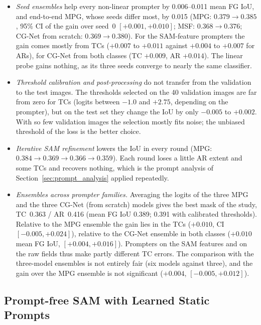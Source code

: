 \begin{itemize}
  \item \emph{Seed ensembles} help every non-linear prompter by 0.006--0.011 mean FG IoU, and end-to-end MPG, whose
  seeds differ most, by 0.015 (MPG: $0.379\rightarrow0.385$,
  95\% CI of the gain over seed~0 $[+0.001,+0.010]$; MSF: $0.368\rightarrow0.376$; CG-Net from scratch:
  $0.369\rightarrow0.380$). For the SAM-feature prompters the gain comes mostly from TCs ($+0.007$ to $+0.011$
  against $+0.004$ to $+0.007$ for ARs), for CG-Net from both classes (TC $+0.009$, AR $+0.014$). The linear probe gains nothing, as
  its three seeds converge to nearly the same classifier.
  \item \emph{Threshold calibration and post-processing} do not transfer from the validation to the test images. The
  thresholds selected on the 40 validation images are far from zero for TCs (logits between $-1.0$ and $+2.75$,
  depending on the prompter), but on the test set they change the IoU by only $-0.005$ to $+0.002$. With so few
  validation images the selection mostly fits noise; the unbiased threshold of the loss is the better choice.
  \item \emph{Iterative SAM refinement} lowers the IoU in every round (MPG: $0.384\rightarrow0.369\rightarrow0.366
  \rightarrow0.359$). Each round loses a little AR extent and some TCs and recovers nothing, which is the prompt
  analysis of Section~\ref{sec:prompt_analysis} applied repeatedly.
  \item \emph{Ensembles across prompter families.} Averaging the logits of the three MPG and the three CG-Net
  (from scratch) models gives the best mask of the study, TC~0.363 / AR~0.416 (mean FG IoU 0.389; 0.391 with calibrated
  thresholds). Relative to the MPG ensemble the gain lies in the TCs ($+0.010$, CI $[-0.005,+0.024]$), relative to the
  CG-Net ensemble in both classes ($+0.010$ mean FG IoU, $[+0.004,+0.016]$). Prompters on the SAM features and on the raw
  fields thus make partly different TC errors. The comparison with the three-model ensembles is not entirely fair (six
  models against three), and the gain over the MPG ensemble is not significant ($+0.004$, $[-0.005,+0.012]$).
\end{itemize}

\subsection{Prompt-free SAM with Learned Static Prompts}
\label{sec:static_prompts}

